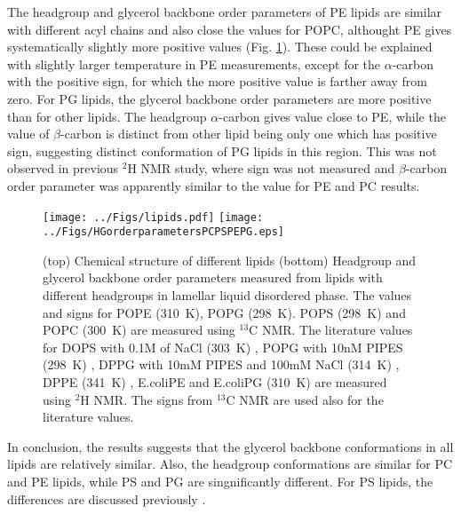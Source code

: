 \documentclass[aps,prl,superscriptaddress,twocolumn]{revtex4}
\begin{document}
The headgroup and glycerol backbone order parameters of PE lipids are similar with 
different acyl chains and also close the values for POPC, althought PE gives systematically
slightly more positive values (Fig. \ref{HGorderParameters}). These could be explained with slightly larger temperature
in PE measurements, except for the $\alpha$-carbon with the positive sign, for which the
more positive value is farther away from zero. For PG lipids, the glycerol backbone order
parameters are more positive than for other lipids. The headgroup $\alpha$-carbon gives
value close to PE, while the value of $\beta$-carbon is distinct from other lipid being
only one which has positive sign, suggesting distinct conformation of PG lipids in this region.
This was not observed in previous $^2$H NMR study, where sign was not measured and $\beta$-carbon
order parameter was apparently similar to the value for PE and PC results.

\begin{figure}[]
  \centering
  \texttt{[image: ../Figs/lipids.pdf]}
  \texttt{[image: ../Figs/HGorderparametersPCPSPEPG.eps]}
  \caption{\label{HGorderParameters}
    (top) Chemical structure of different lipids
    (bottom) Headgroup and glycerol backbone order parameters measured from lipids
    with different headgroups in lamellar liquid disordered phase.
    The values and signs for POPE (310~K), POPG (298~K). POPS (298~K) \cite{NMRlipidsIVps} and POPC (300~K) \cite{ferreira13,ferreira16}
    are measured using $^{13}$C NMR. The literature values for
    DOPS with 0.1M of NaCl (303~K) \cite{browning80},
    POPG with 10nM PIPES (298~K) \cite{borle85},
    DPPG with 10mM PIPES and 100mM NaCl (314~K) \cite{wohlgemuth80}, 
    DPPE (341~K) \cite{seelig76},
    E.coliPE and E.coliPG (310~K) \cite{gally81}
    are measured using $^2$H NMR. The signs from $^{13}$C NMR are used also for the literature values.
  }
\end{figure}

In conclusion, the results suggests that the glycerol backbone conformations in all lipids are
relatively similar. Also, the headgroup conformations are similar for PC and PE lipids, while
PS and PG are singnificantly different. For PS lipids, the differences are discussed previously \cite{??}.
\end{document}
